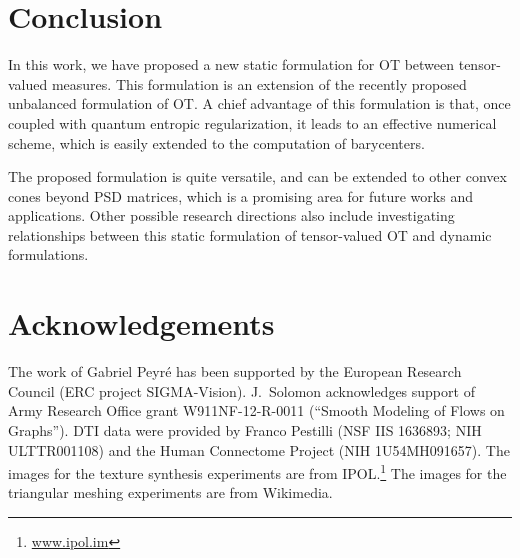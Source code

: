 
\section{Conclusion}

In this work, we have proposed a new static formulation for OT between tensor-valued measures. This formulation is an extension of the recently proposed unbalanced formulation of OT. A chief advantage of this formulation is that, once coupled with quantum entropic regularization, it leads to an effective numerical scheme, which is easily extended to the computation of barycenters. 

The proposed formulation is quite versatile, and can be extended to other convex cones beyond PSD matrices, which is a promising area for future works and applications.
%
Other possible research directions also include investigating relationships between this static formulation of tensor-valued OT and dynamic formulations. 

\section*{Acknowledgements}

The work of Gabriel Peyr\'e has been supported by the European Research Council (ERC project SIGMA-Vision). 
%
J.\ Solomon acknowledges support of Army Research Office grant W911NF-12-R-0011 (``Smooth Modeling of Flows on Graphs'').
%
DTI data were provided by Franco Pestilli (NSF IIS 1636893; NIH ULTTR001108) and the Human Connectome Project (NIH 1U54MH091657). 
%
The images for the texture synthesis experiments are from IPOL.\footnote{\url{www.ipol.im}}
% 
The images for the triangular meshing experiments are from Wikimedia.
